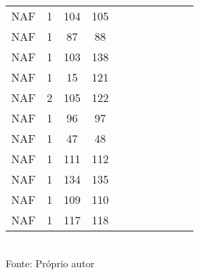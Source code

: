 \begin{table}[H]
{\begin{tabular}{ccccccccccc}
NAF & 1 & 104 & 105 &  &  &  &  &  &  &  \\
NAF & 1 & 87 & 88 &  &  &  &  &  &  &  \\
NAF & 1 & 103 & 138 &  &  &  &  &  &  &  \\
NAF & 1 & 15 & 121 &  &  &  &  &  &  &  \\
NAF & 2 & 105 & 122 &  &  &  &  &  &  &  \\
NAF & 1 & 96 & 97 &  &  &  &  &  &  &  \\
NAF & 1 & 47 & 48 &  &  &  &  &  &  &  \\
NAF & 1 & 111 & 112 &  &  &  &  &  &  &  \\
NAF & 1 & 134 & 135 &  &  &  &  &  &  &  \\
NAF & 1 & 109 & 110 &  &  &  &  &  &  &  \\
NAF & 1 & 117 & 118 &  &  &  &  &  &  &  \\
\bottomrule
\end{tabular}}
\\Fonte: Próprio autor
\end{table}


